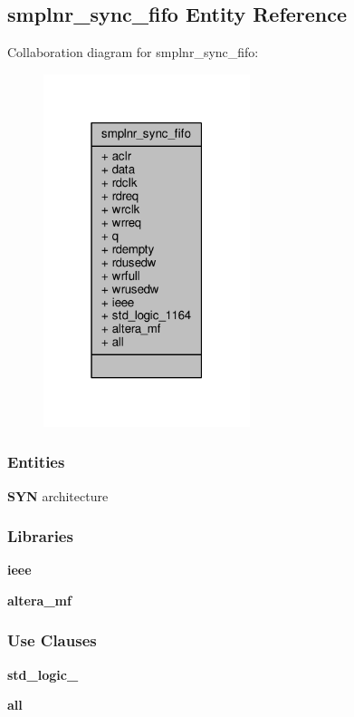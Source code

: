 \subsection{smplnr\+\_\+sync\+\_\+fifo Entity Reference}
\label{classsmplnr__sync__fifo}


Collaboration diagram for smplnr\+\_\+sync\+\_\+fifo\+:\nopagebreak
\begin{figure}[H]
\begin{center}
\leavevmode
\includegraphics[width=171pt]{d6/dcf/classsmplnr__sync__fifo__coll__graph}
\end{center}
\end{figure}
\subsubsection*{Entities}
\begin{DoxyCompactItemize}
\item 
{\bf S\+YN} architecture
\end{DoxyCompactItemize}
\subsubsection*{Libraries}
 \begin{DoxyCompactItemize}
\item 
{\bf ieee} 
\item 
{\bf altera\+\_\+mf} 
\end{DoxyCompactItemize}
\subsubsection*{Use Clauses}
 \begin{DoxyCompactItemize}
\item 
{\bf std\+\_\+logic\+\_}   
\item 
{\bf  all }   
\end{DoxyCompactItemize}
